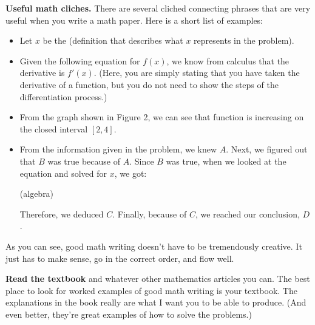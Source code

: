 \documentclass{article}
\begin{document}
\textbf{Useful math cliches.} There are several cliched connecting phrases that are very useful when you write a math paper.
Here is a short list of examples:
\begin{itemize}
	\item Let $x$ be the (definition that describes what $x$ represents in the problem).
	\item Given the following equation for $f(x)$, we know from calculus that the derivative is $f'(x)$. (Here, you are simply stating that you have taken the derivative of a function, but you do not need to show the steps of the differentiation process.)
	\item From the graph shown in Figure 2, we can see that function is increasing on the closed interval $[2,4]$.
	\item From the information given in the problem, we knew $A$. Next, we figured out that $B$ was true because of $A$. Since $B$ was true, when we looked at the equation and solved for $x$, we got: \begin{center} (algebra) \end{center}
Therefore, we deduced $C$. Finally, because of $C$, we reached our conclusion, $D$.
\end{itemize}


As you can see, good math writing doesn't have to be tremendously creative. It just has to make sense, go in the correct order, and flow well.

\textbf{Read the textbook} and whatever other mathematics articles you can. The best place to look for worked examples of good math writing is your textbook. The explanations in the book really are what I want you to be able to produce. (And even better, they're great examples of how to solve the problems.)
\end{document}
